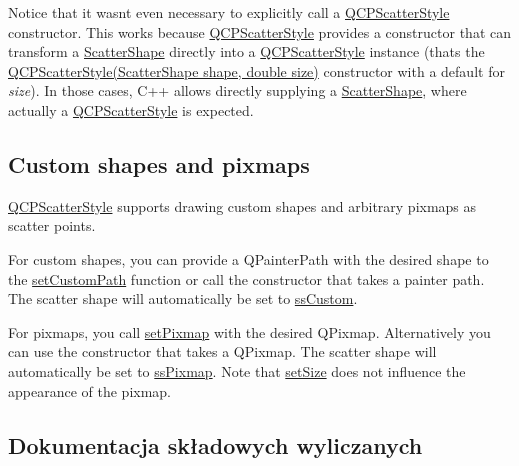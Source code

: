 \begin{DoxyCodeInclude}
\end{DoxyCodeInclude}
 Notice that it wasn\textquotesingle{}t even necessary to explicitly call a \hyperlink{class_q_c_p_scatter_style}{Q\+C\+P\+Scatter\+Style} constructor. This works because \hyperlink{class_q_c_p_scatter_style}{Q\+C\+P\+Scatter\+Style} provides a constructor that can transform a \hyperlink{class_q_c_p_scatter_style_adb31525af6b680e6f1b7472e43859349}{Scatter\+Shape} directly into a \hyperlink{class_q_c_p_scatter_style}{Q\+C\+P\+Scatter\+Style} instance (that\textquotesingle{}s the \hyperlink{class_q_c_p_scatter_style_a003d92f74f4561eda111862eadd62f28}{Q\+C\+P\+Scatter\+Style(\+Scatter\+Shape shape, double size)} constructor with a default for {\itshape size}). In those cases, C++ allows directly supplying a \hyperlink{class_q_c_p_scatter_style_adb31525af6b680e6f1b7472e43859349}{Scatter\+Shape}, where actually a \hyperlink{class_q_c_p_scatter_style}{Q\+C\+P\+Scatter\+Style} is expected.\hypertarget{class_q_c_p_scatter_style_QCPScatterStyle-custompath-and-pixmap}{}\subsection{Custom shapes and pixmaps}\label{class_q_c_p_scatter_style_QCPScatterStyle-custompath-and-pixmap}
\hyperlink{class_q_c_p_scatter_style}{Q\+C\+P\+Scatter\+Style} supports drawing custom shapes and arbitrary pixmaps as scatter points.

For custom shapes, you can provide a Q\+Painter\+Path with the desired shape to the \hyperlink{class_q_c_p_scatter_style_a96a3e949f90b2afe5677ca9412a12a1e}{set\+Custom\+Path} function or call the constructor that takes a painter path. The scatter shape will automatically be set to \hyperlink{class_q_c_p_scatter_style_adb31525af6b680e6f1b7472e43859349a15d9bcfd9de94edda949006529f9219d}{ss\+Custom}.

For pixmaps, you call \hyperlink{class_q_c_p_scatter_style_a5fb611d46acfac520d7b89a1c71d9246}{set\+Pixmap} with the desired Q\+Pixmap. Alternatively you can use the constructor that takes a Q\+Pixmap. The scatter shape will automatically be set to \hyperlink{class_q_c_p_scatter_style_adb31525af6b680e6f1b7472e43859349a8718b849ca7c307b07b8e091efb0c31e}{ss\+Pixmap}. Note that \hyperlink{class_q_c_p_scatter_style_aaefdd031052892c4136129db68596e0f}{set\+Size} does not influence the appearance of the pixmap. 

\subsection{Dokumentacja składowych wyliczanych}
